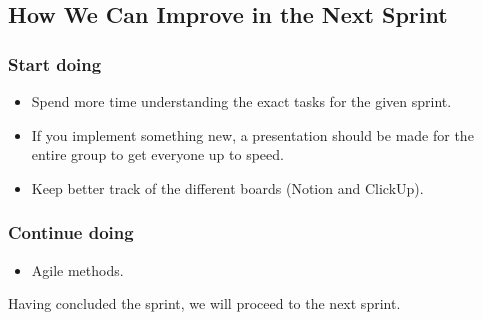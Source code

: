 \subsection{How We Can Improve in the Next Sprint}
\subsubsection{Start doing}
\begin{itemize}
    \item Spend more time understanding the exact tasks for the given sprint.
    \item If you implement something new, a presentation should be made for the entire group to get everyone up to speed.
    \item Keep better track of the different boards (Notion and ClickUp).
\end{itemize}
\subsubsection{Continue doing}
\begin{itemize}
    \item Agile methods.
\end{itemize}

Having concluded the sprint, we will proceed to the next sprint.